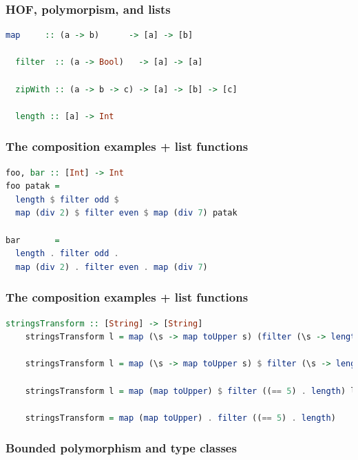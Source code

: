 \documentclass[10pt,pdf,utf8,russian,aspectratio=169]{beamer}
\begin{document}
\begin{frame}[fragile]
  \frametitle{HOF, polymorpism, and lists}

  \begin{lstlisting}[language=Haskell]
  map     :: (a -> b)      -> [a] -> [b]

  filter  :: (a -> Bool)   -> [a] -> [a]

  zipWith :: (a -> b -> c) -> [a] -> [b] -> [c]

  length :: [a] -> Int
  \end{lstlisting}

\vspace{\baselineskip}

\end{frame}

\begin{frame}[fragile]
    \frametitle{The composition examples + list functions}
\begin{lstlisting}[language=Haskell]
foo, bar :: [Int] -> Int
foo patak =
  length $ filter odd $
  map (div 2) $ filter even $ map (div 7) patak

bar       =
  length . filter odd .
  map (div 2) . filter even . map (div 7)
\end{lstlisting}
\end{frame}

\begin{frame}[fragile]
    \frametitle{The composition examples + list functions}
    \begin{lstlisting}[language=Haskell]
    stringsTransform :: [String] -> [String]
    stringsTransform l = map (\s -> map toUpper s) (filter (\s -> length s == 5) l)

    stringsTransform l = map (\s -> map toUpper s) $ filter (\s -> length s == 5) l

    stringsTransform l = map (map toUpper) $ filter ((== 5) . length) l

    stringsTransform = map (map toUpper) . filter ((== 5) . length)
    \end{lstlisting}
\end{frame}

\begin{frame}
  \frametitle{Bounded polymorphism and type classes}


\end{frame}
\end{document}
